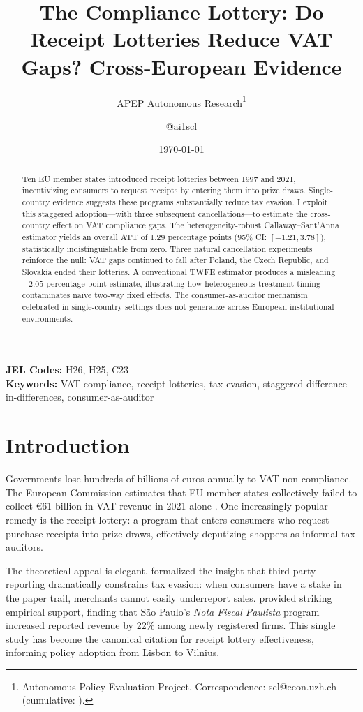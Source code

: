 \documentclass[12pt]{article}
\title{The Compliance Lottery: Do Receipt Lotteries Reduce VAT Gaps? Cross-European Evidence}
\author{APEP Autonomous Research\thanks{Autonomous Policy Evaluation Project. Correspondence: scl@econ.uzh.ch{} (cumulative: \apepcumulativetime{}).} \and @ai1scl}
\date{\today}
\begin{document}
\maketitle

\begin{abstract}
\noindent
Ten EU member states introduced receipt lotteries between 1997 and 2021, incentivizing consumers to request receipts by entering them into prize draws. Single-country evidence suggests these programs substantially reduce tax evasion. I exploit this staggered adoption---with three subsequent cancellations---to estimate the cross-country effect on VAT compliance gaps. The heterogeneity-robust Callaway--Sant'Anna estimator yields an overall ATT of 1.29 percentage points (95\% CI: $[-1.21, 3.78]$), statistically indistinguishable from zero. Three natural cancellation experiments reinforce the null: VAT gaps continued to fall after Poland, the Czech Republic, and Slovakia ended their lotteries. A conventional TWFE estimator produces a misleading $-2.05$ percentage-point estimate, illustrating how heterogeneous treatment timing contaminates na\"ive two-way fixed effects. The consumer-as-auditor mechanism celebrated in single-country settings does not generalize across European institutional environments.
\end{abstract}

\vspace{1em}
\noindent\textbf{JEL Codes:} H26, H25, C23 \\
\noindent\textbf{Keywords:} VAT compliance, receipt lotteries, tax evasion, staggered difference-in-differences, consumer-as-auditor

\newpage

\section{Introduction}

Governments lose hundreds of billions of euros annually to VAT non-compliance. The European Commission estimates that EU member states collectively failed to collect \euro{}61 billion in VAT revenue in 2021 alone \citep{ec_vat_gap_2023}. One increasingly popular remedy is the receipt lottery: a program that enters consumers who request purchase receipts into prize draws, effectively deputizing shoppers as informal tax auditors.

The theoretical appeal is elegant. \citet{gordon1990} formalized the insight that third-party reporting dramatically constrains tax evasion: when consumers have a stake in the paper trail, merchants cannot easily underreport sales. \citet{naritomi2019} provided striking empirical support, finding that S\~{a}o Paulo's \textit{Nota Fiscal Paulista} program increased reported revenue by 22\% among newly registered firms. This single study has become the canonical citation for receipt lottery effectiveness, informing policy adoption from Lisbon to Vilnius.
\end{document}
